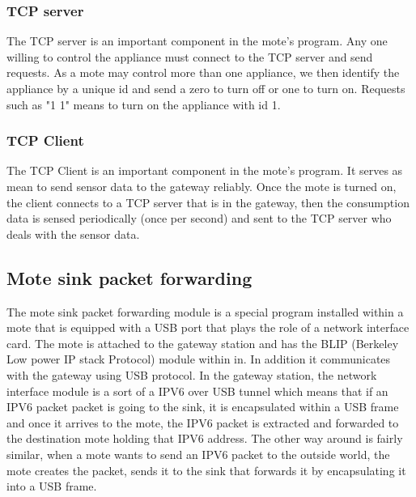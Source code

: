 \documentclass[conference]{IEEEtran}
\begin{document}
\subsubsection{TCP server}
The TCP server is an important component in the mote's program. Any one willing to control the appliance must connect to the TCP server and send requests. As a mote may control more than one appliance, we then identify the appliance by a unique id and send a zero to turn off or one to turn on. Requests such as "1 1" means to turn on the appliance with id 1.
\subsubsection{TCP Client}
The TCP Client is an important component in the mote's program. It serves as mean to send sensor data to the gateway reliably. Once the mote is turned on, the client connects to a TCP server that is in the gateway, then the consumption data is sensed periodically (once per second) and sent to the TCP server who deals with the sensor data.

\subsection{Mote sink packet forwarding}
The mote sink packet forwarding module is a special program installed within a mote that is equipped with a USB port that plays the role of a network interface card. The mote is attached to the gateway station and has the BLIP (Berkeley Low power IP stack Protocol) module within in. In addition it communicates with the gateway using USB protocol. In the gateway station, the network interface module is a sort of a IPV6 over USB tunnel which means that if an IPV6 packet packet is going to the sink, it is encapsulated within a USB frame and once it arrives to the mote, the IPV6 packet is extracted and forwarded to the destination mote holding that IPV6 address. The other way around is fairly similar, when a mote wants to send an IPV6 packet to the outside world, the mote creates the packet, sends it to the sink that forwards it by encapsulating it into a USB frame.
\end{document}

